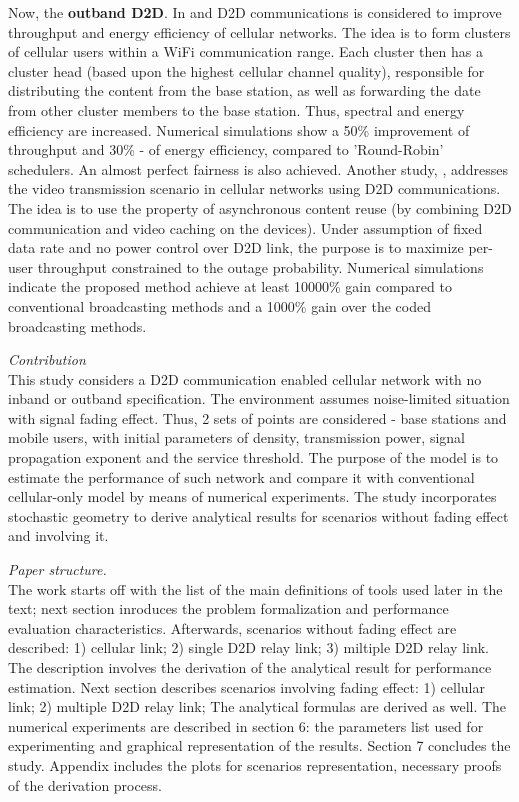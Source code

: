 \par Now, the {\bf outband D2D}. 
In \cite {asadi} and \cite {mancuso} D2D communications is considered to improve throughput and energy efficiency of cellular networks. The idea is to form clusters of cellular users within a WiFi communication range. Each cluster then has a cluster head (based upon the highest cellular channel quality), responsible for distributing the content from the base station, as well as forwarding the date from other cluster members to the base station. 
Thus, spectral and energy efficiency are increased. 
Numerical simulations show a 50\% improvement of throughput and 30\% - of energy efficiency, compared to 'Round-Robin' schedulers. An almost perfect fairness is also achieved. 
Another study, \cite {caching}, addresses the video transmission scenario in cellular networks using D2D communications. The idea is to use the property of asynchronous content reuse (by combining D2D communication and video caching on the devices). Under assumption of fixed data rate and no power control over D2D link, the purpose is to maximize per-user throughput constrained to the outage probability. 
Numerical simulations indicate the proposed method achieve at least 10000\% gain compared to conventional broadcasting methods and a 1000\% gain over the coded broadcasting methods.
\vspace{1cm}
\par {\it Contribution}
\\This study considers a D2D communication enabled cellular network with no inband or outband specification. 
The environment assumes noise-limited situation with signal fading effect. 
Thus, 2 sets of points are considered - base stations and mobile users, with initial parameters of density, transmission power, signal propagation exponent and the service threshold. 
The purpose of the model is to estimate the performance of such network and compare it with conventional cellular-only model by means of numerical experiments. 
The study incorporates stochastic geometry to derive analytical results for scenarios without fading effect and involving it.
\vspace{1cm} 
\par {\it Paper structure.}
\\The work starts off with the list of the main definitions of tools used later in the text; 
next section inroduces the problem formalization and performance evaluation characteristics. 
Afterwards, scenarios without fading effect are described: 
1) cellular link; 
2) single D2D relay link; 
3) miltiple D2D relay link. 
The description involves the derivation of the analytical result for performance estimation. 
Next section describes scenarios involving fading effect: 
1) cellular link;
2) multiple D2D relay link;
The analytical formulas are derived as well. 
The numerical experiments are described in section 6: the parameters list used for experimenting and graphical representation of the results. 
Section 7 concludes the study. 
Appendix includes the plots for scenarios representation, necessary proofs of the derivation process. 

